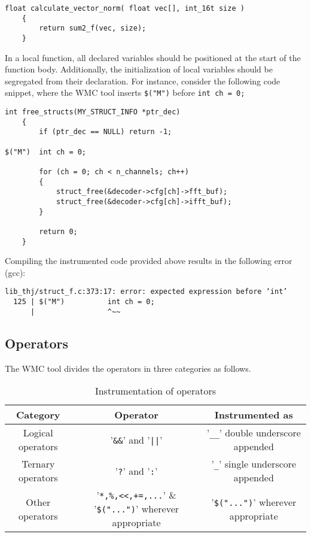 \begin{Verbatim}[fontsize=\small]
    float calculate_vector_norm( float vec[], int_16t size ) 
    {
        return sum2_f(vec, size); 
    }
\end{Verbatim}

In a local function, all declared variables should be positioned at the start of the function body. Additionally, the initialization of local variables should be segregated from their declaration. For instance, consider the following code snippet, where the WMC tool inserts \verb|$("M")| before \verb|int ch = 0;|

\begin{Verbatim}[fontsize=\small]
    int free_structs(MY_STRUCT_INFO *ptr_dec)
    {   
        if (ptr_dec == NULL) return -1;
    
$("M")  int ch = 0;

        for (ch = 0; ch < n_channels; ch++) 
        {
            struct_free(&decoder->cfg[ch]->fft_buf);
            struct_free(&decoder->cfg[ch]->ifft_buf);
        }

        return 0;
    }
\end{Verbatim}

Compiling the instrumented code provided above results in the following error (gcc):

\begin{Verbatim}[fontsize=\small]
lib_thj/struct_f.c:373:17: error: expected expression before ‘int’
  125 | $("M")          int ch = 0;
      |                 ^~~
\end{Verbatim}


\subsection{Operators}

The WMC tool divides the operators in three categories as follows.

\begin{table}[!hb]
\centering\small
\caption{Instrumentation of operators}
\begin{tabular}{|c|c|c|}
\hline
\textbf{Category} & \textbf{Operator} & \textbf{Instrumented as} \\
\hline
Logical operators & '\verb|&&|' and '\verb$||$' & '\verb|__|' double underscore appended \\
\hline
Ternary operators & '\verb|?|' and '\verb|:|' & '\verb|_|' single underscore appended \\
\hline
Other operators & '\verb|*,%,<<,+=,...|' & '\verb|$("...")|' wherever appropriate \\
\hline
\end{tabular}
\label{tab:instrumentation_of_operators}
\end{table}


